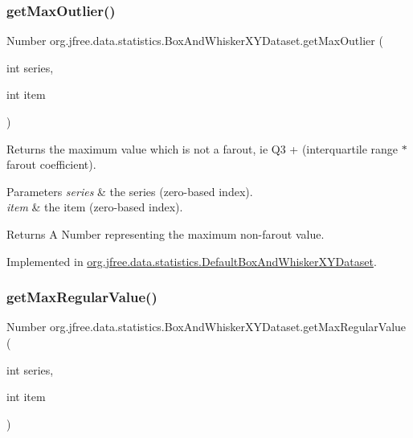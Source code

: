 \subsubsection{\texorpdfstring{get\+Max\+Outlier()}{getMaxOutlier()}}
{\footnotesize\ttfamily Number org.\+jfree.\+data.\+statistics.\+Box\+And\+Whisker\+X\+Y\+Dataset.\+get\+Max\+Outlier (\begin{DoxyParamCaption}\item[{int}]{series,  }\item[{int}]{item }\end{DoxyParamCaption})}

Returns the maximum value which is not a farout, ie Q3 + (interquartile range $\ast$ farout coefficient).


\begin{DoxyParams}{Parameters}
{\em series} & the series (zero-\/based index). \\
\hline
{\em item} & the item (zero-\/based index).\\
\hline
\end{DoxyParams}
\begin{DoxyReturn}{Returns}
A {\ttfamily Number} representing the maximum non-\/farout value. 
\end{DoxyReturn}


Implemented in \mbox{\hyperlink{classorg_1_1jfree_1_1data_1_1statistics_1_1_default_box_and_whisker_x_y_dataset_a3bf4cfe81f62aa7bcea3b0abf9e045d3}{org.\+jfree.\+data.\+statistics.\+Default\+Box\+And\+Whisker\+X\+Y\+Dataset}}.

\mbox{\label{interfaceorg_1_1jfree_1_1data_1_1statistics_1_1_box_and_whisker_x_y_dataset_a152f6bb587ba044108d7ddf68808f333}} 
\subsubsection{\texorpdfstring{get\+Max\+Regular\+Value()}{getMaxRegularValue()}}
{\footnotesize\ttfamily Number org.\+jfree.\+data.\+statistics.\+Box\+And\+Whisker\+X\+Y\+Dataset.\+get\+Max\+Regular\+Value (\begin{DoxyParamCaption}\item[{int}]{series,  }\item[{int}]{item }\end{DoxyParamCaption})}

